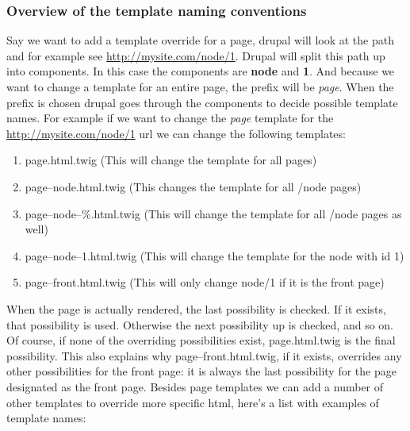 \subsubsection{Overview of the template naming conventions}

Say we want to add a template override for a page, drupal will look at the path and for example see \url{http://mysite.com/node/1}. Drupal will split this path up into components. In this case the components are \textbf{node} and \textbf{1}. And because we want to change a template for an entire page, the prefix will be \textit{page}. When the prefix is chosen drupal goes through the components to decide possible template names. For example if we want to change the \textit{page} template for the \url{http://mysite.com/node/1} url we can change the following templates:

\begin{enumerate}
	\item page.html.twig (This will change the template for all pages)
	\item page--node.html.twig (This changes the template for all /node pages)
	\item page--node--\%.html.twig (This will change the template for all /node pages as well)
	\item page--node--1.html.twig (This will change the template for the node with id 1)
	\item page--front.html.twig (This will only change node/1 if it is the front page)
\end{enumerate}

When the page is actually rendered, the last possibility is checked. If it exists, that possibility is used. Otherwise the next possibility up is checked, and so on. Of course, if none of the overriding possibilities exist, page.html.twig is the final possibility. This also explains why page--­­front.html.twig, if it exists, overrides any other possibilities for the front page: it is always the last possibility for the page designated as the front page. Besides page templates we can add a number of other templates to override more specific html, here’s a list with examples of template names:


